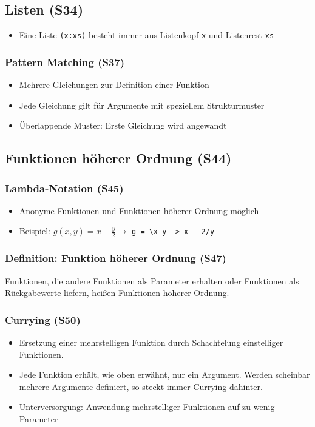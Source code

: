\subsection{Listen (S34)}
\begin{itemize}
	\item Eine Liste \texttt{(x:xs)} besteht immer aus Listenkopf \texttt{x} und Listenrest \texttt{xs}
\end{itemize}

\subsubsection{Pattern Matching (S37)}
\begin{itemize}
	\item Mehrere Gleichungen zur Definition einer Funktion
	\item Jede Gleichung gilt für Argumente mit speziellem Strukturmuster
	\item Überlappende Muster: Erste Gleichung wird angewandt
\end{itemize}


\subsection{Funktionen höherer Ordnung (S44)}

\subsubsection{Lambda-Notation (S45)}
\begin{itemize}
	\item Anonyme Funktionen und Funktionen höherer Ordnung möglich
	\item Beispiel: \(g(x,y)=x-\frac{y}{2} \longrightarrow\) \texttt{g = \textbackslash x y -> x - 2/y}
\end{itemize}

\subsubsection{Definition: Funktion höherer Ordnung (S47)}
Funktionen, die andere Funktionen als Parameter erhalten oder Funktionen als Rückgabewerte liefern, heißen Funktionen höherer Ordnung.

\subsubsection{Currying (S50)}
\begin{itemize}
	\item Ersetzung einer mehrstelligen Funktion durch Schachtelung einstelliger Funktionen.
	\item Jede Funktion erhält, wie oben erwähnt, nur ein Argument. Werden scheinbar mehrere Argumente definiert, so steckt immer Currying dahinter.
	\item Unterversorgung: Anwendung mehrstelliger Funktionen auf zu wenig Parameter
\end{itemize}

